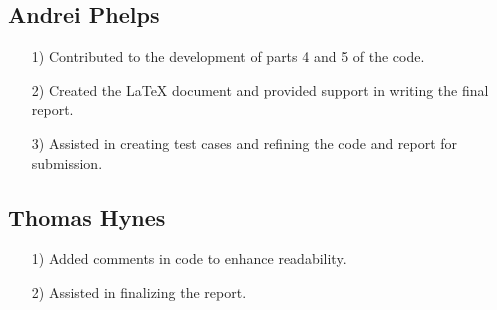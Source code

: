 \documentclass{article}
\begin{document}
\subsection{Andrei Phelps}
\begin{itemize}
    \item[1)] Contributed to the development of parts 4 and 5 of the code.
    \item[2)] Created the LaTeX document and provided support in writing the final report.
    \item[3)] Assisted in creating test cases and refining the code and report for submission.
\end{itemize}

\subsection{Thomas Hynes}
\begin{itemize}
    \item[1)] Added comments in code to enhance readability.
    \item[2)] Assisted in finalizing the report.
\end{itemize}
\end{document}

